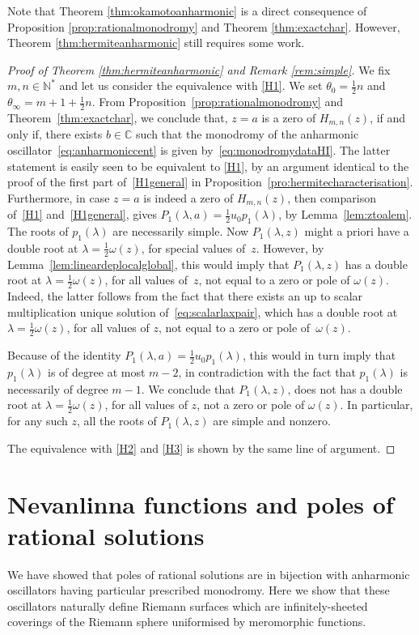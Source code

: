 \documentclass[pdftex]{sigma}
\numberwithin{equation}{section}
\newcommand{\om}{\omega}
\begin{document}
Note that Theorem \ref{thm:okamotoanharmonic} is a direct consequence of Proposition \ref{prop:rationalmonodromy} and Theorem \ref{thm:exactchar}. However, Theorem \ref{thm:hermiteanharmonic} still requires some work.
\begin{proof}[Proof of Theorem \ref{thm:hermiteanharmonic} and Remark \ref{rem:simple}]
	We f\/ix $m,n\in\mathbb{N}^*$ and let us consider the equivalence with \ref{H1}. We set $\theta_0=\tfrac{1}{2}n$ and $\theta_\infty=m+1+\tfrac{1}{2}n$. From Proposition~\ref{prop:rationalmonodromy} and Theorem~\ref{thm:exactchar}, we conclude that, $z=a$ is a zero of $H_{m,n}(z)$, if and only if, there exists $b\in\mathbb{C}$ such that the monodromy of the anharmonic oscillator~\eqref{eq:anharmoniccent} is given by~\eqref{eq:monodromydataHI}. The latter statement is easily seen to be equivalent to \ref{H1}, by an argument identical to the proof of the f\/irst part of~\ref{H1general} in Proposition~\ref{pro:hermitecharacterisation}. Furthermore, in case $z=a$ is indeed a zero of $H_{m,n}(z)$, then comparison of~\ref{H1} and~\ref{H1general}, gives $P_1(\lambda,a)=\tfrac{1}{2}u_0p_1(\lambda)$, by Lemma~\ref{lem:ztoalem}.
		The roots of $p_1(\lambda)$ are necessarily simple. Now $P_1(\lambda,z)$ might a priori have a double root at $\lambda=\tfrac{1}{2}\om(z)$, for special values of~$z$. However, by Lemma~\ref{lem:lineardeplocalglobal}, this would imply that $P_1(\lambda,z)$ has a double root at $\lambda=\tfrac{1}{2}\om(z)$, for all values of~$z$, not equal to a zero or pole of $\om(z)$. Indeed, the latter follows from the fact that there exists an up to scalar multiplication unique solution of~\eqref{eq:scalarlaxpair}, which has a double root at $\lambda=\tfrac{1}{2}\om(z)$, for all values of $z$, not equal to a zero or pole of~$\om(z)$.
		
		Because of the identity $P_1(\lambda,a)=\tfrac{1}{2}u_0p_1(\lambda)$, this would in turn imply that $p_1(\lambda)$ is of degree at most $m-2$, in contradiction with the fact that $p_1(\lambda)$ is necessarily of degree $m-1$.
		We conclude that $P_1(\lambda,z)$, does not has a double root at $\lambda=\tfrac{1}{2}\om(z)$, for all values of $z$, not a zero or pole of $\om(z)$. In particular, for any such $z$, all the roots of $P_1(\lambda,z)$ are simple and nonzero.
		
		The equivalence with \ref{H2} and \ref{H3} is shown by the same line of argument.
	\end{proof}

\section{Nevanlinna functions and poles of rational solutions}\label{section:nevanlinna}
We have showed that poles of rational solutions are in bijection with anharmonic oscillators having particular prescribed monodromy.
Here we show that these oscillators naturally def\/ine Riemann surfaces which are inf\/initely-sheeted coverings of the
Riemann sphere uniformised by meromorphic functions.
\end{document}
